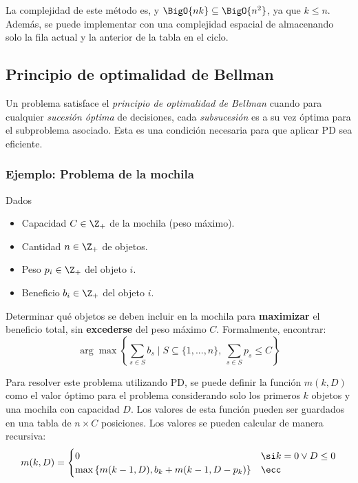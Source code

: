 La complejidad de este método es, y $\BigO{nk} \subseteq \BigO{n^2}$, ya que $k \leq n$. Además, se puede implementar con una complejidad espacial de almacenando solo la fila actual y la anterior de la tabla en el ciclo.

\subsection{Principio de optimalidad de Bellman}
\label{optimalidad-bellman}

Un problema satisface el \textit{principio de optimalidad de Bellman} cuando para cualquier \textit{sucesión óptima} de decisiones, cada \textit{subsucesión} es a su vez óptima para el subproblema asociado. Esta es una condición necesaria para que aplicar PD sea eficiente.

\subsubsection{Ejemplo: Problema de la mochila}
\label{problema-mochila}

\begin{problema}
    Dados
    \begin{itemize}
        \item Capacidad $C \in \Z_+$ de la mochila (peso máximo).
        \item Cantidad $n \in \Z_+$ de objetos.
        \item Peso $p_i \in \Z_+$ del objeto $i$.
        \item Beneficio $b_i \in \Z_+$ del objeto $i$.
    \end{itemize}

    Determinar qué objetos se deben incluir en la mochila para \textbf{maximizar} el beneficio total, sin \textbf{excederse} del peso máximo $C$. Formalmente, encontrar:
    $$\arg\max{\left\{\sum_{s \in S} b_s \mid S \subseteq \{1, ..., n\},\ \sum_{s \in S} p_s \leq C \right\}}$$
\end{problema}

Para resolver este problema utilizando PD, se puede definir la función $m(k, D)$ como el valor óptimo para el problema considerando solo los primeros $k$ objetos y una mochila con capacidad $D$. Los valores de esta función pueden ser guardados en una tabla de $n \times C$ posiciones. Los valores se pueden calcular de manera recursiva:
$$
    m(k, D) =
    \begin{cases}
        0                                              & \si k = 0 \lor D \leq 0 \\
        \max{\{m(k - 1, D), b_k + m(k - 1, D - p_k)\}} & \ecc
    \end{cases}
$$

